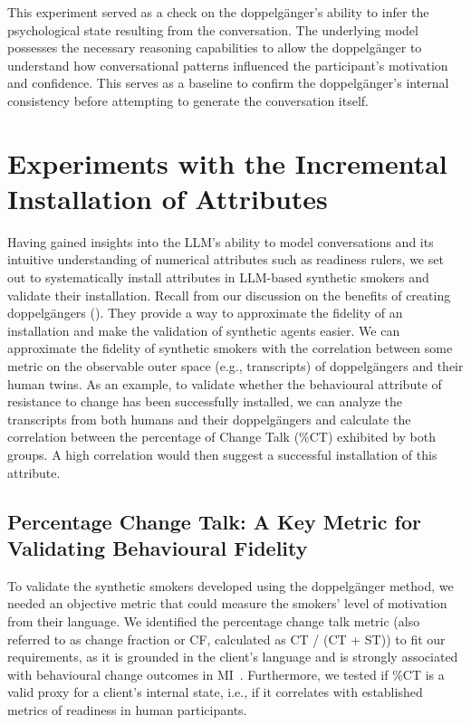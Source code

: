 This experiment served as a check on the doppelgänger's ability to infer the psychological state resulting from the conversation. The underlying model possesses the necessary reasoning capabilities to allow the doppelgänger to understand how conversational patterns influenced the participant's motivation and confidence. This serves as a baseline to confirm the doppelgänger's internal consistency before attempting to generate the conversation itself.



\section{Experiments with the Incremental Installation of Attributes}
Having gained insights into the LLM's ability to model conversations and its intuitive understanding of numerical attributes such as readiness rulers, we set out to systematically install attributes in LLM-based synthetic smokers and validate their installation. Recall from our discussion on the benefits of creating doppelgängers (). They provide a way to approximate the fidelity of an installation and make the validation of synthetic agents easier. We can approximate the fidelity of synthetic smokers with the correlation between some metric on the observable outer space (e.g., transcripts) of doppelgängers and their human twins. As an example, to validate whether the behavioural attribute of resistance to change has been successfully installed, we can analyze the transcripts from both humans and their doppelgängers and calculate the correlation between the percentage of Change Talk (\%CT) exhibited by both groups. A high correlation would then suggest a successful installation of this attribute.


\subsection*{Percentage Change Talk: A Key Metric for Validating Behavioural Fidelity}

To validate the synthetic smokers developed using the doppelgänger method, we needed an objective metric that could measure the smokers' level of motivation from their language.
We identified the percentage change talk metric (also referred to as change fraction or CF, calculated as CT / (CT + ST)) to fit our requirements, as it is grounded in the client's language and is strongly associated with behavioural change outcomes in MI~\cite{Barnett2014,Houck2018,Moyers2009,Baer2008}.
Furthermore, we tested if \%CT is a valid proxy for a client's internal state, i.e., if it correlates with established metrics of readiness in human participants.

